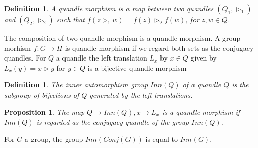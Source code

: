 \documentclass[12pt, reqno]{amsart}
\newtheorem{proposition}[theorem]{Proposition}
\newtheorem{definition}[theorem]{Definition}
\begin{document}
\begin{definition}
 A quandle morphism is a map between two quandles $(Q_1,\triangleright_1)$ and $(Q_2 ,\triangleright_2)$ such that $f(z \triangleright_1 w)=f(z) \triangleright_2 f(w)$, for $z,w \in Q$.
\end{definition}
The composition of two quandle morphism is a quandle morphism. A group morhism $f:G\to H$ is quandle morphism if we regard both sets as the conjugacy quandles. For $Q$ a quandle the left translation $L_x$ by $x\in Q$ given by $L_x(y)=x\triangleright y$ for $y\in Q$ is a bijective quandle morphism  
\begin{definition}
The inner automorphism group $Inn(Q)$ of a quandle $Q$ is the subgroup of bijections of $Q$ generated by the left translations.
\end{definition}
\begin{proposition}
The map $Q\to Inn(Q), x\mapsto L_x$ is a quandle morphism if $Inn(Q)$ is regarded as the conjugacy quandle of the group $Inn(Q)$.
\end{proposition}  
For $G$ a group, the group $Inn(Conj(G))$ is equal to $Inn(G)$.
\end{document}
